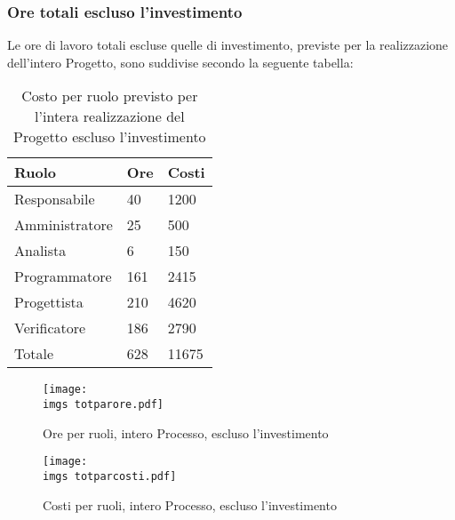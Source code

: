 {{	\subsubsection{Ore totali escluso l’investimento}{
		Le ore di lavoro totali escluse quelle di investimento, previste per la realizzazione dell’intero Progetto, sono suddivise secondo la seguente tabella:
		\begin{table}[H]
			 \centering
			 \begin{tabular}{p{}p{}
				  		  				p{}}
				  \toprule Ruolo & Ore  & Costi \\
				  \midrule
				  Responsabile & 40  & 1200 \\
				  Amministratore & 25  & 500 \\
				  Analista & 6   & 150 \\
				  Programmatore & 161  & 2415 \\
				  Progettista & 210  & 4620 \\
				  Verificatore & 186  & 2790 \\
				  Totale & 628  & 11675 \\
				  \bottomrule
			 \end{tabular}
			 \label{tab:costonoinvestimento}
			 \caption{Costo per ruolo previsto per l’intera realizzazione del Progetto escluso l’investimento}
		\end{table}
		
		\begin{figure}[H]
			\centering
			\texttt{[image: \\imgs totparore.pdf]}
			\label{fig:orenoinvestimento}
			\caption{Ore per ruoli, intero Processo, escluso l’investimento}
		\end{figure}
		\begin{figure}[H]
			\centering
			\texttt{[image: \\imgs totparcosti.pdf]}
			\label{fig:costonoinvestimento}
			\caption{Costi per ruoli, intero Processo, escluso l’investimento}
		\end{figure}
	}
}
}